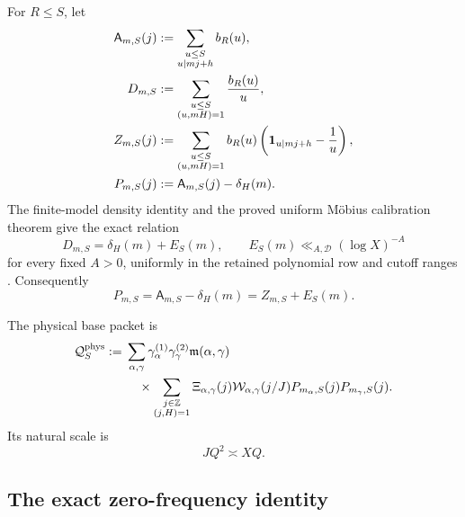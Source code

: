For $R\le S$, let
\begin{align}
 \mathsf A_{m,S}(j)
 &:=\sum_{\substack{u\le S\\u\mid mj+h}}b_R(u),
 \label{eq:tpc28-raw-prefix}\\
 D_{m,S}
 &:=\sum_{\substack{u\le S\\(u,mH)=1}}\frac{b_R(u)}u,
 \label{eq:tpc28-prefix-density}\\
 Z_{m,S}(j)
 &:=\sum_{\substack{u\le S\\(u,mH)=1}}
 b_R(u)\left(\mathbf 1_{u\mid mj+h}-\frac1u\right),
 \label{eq:tpc28-centered-prefix}\\
 P_{m,S}(j)
 &:=\mathsf A_{m,S}(j)-\delta_H(m).
 \label{eq:tpc28-calibrated-prefix}
\end{align}
The finite-model density identity and the proved uniform M\"obius
calibration theorem give the exact relation
\begin{equation}
 D_{m,S}=\delta_H(m)+E_S(m),
 \qquad
 E_S(m)\ll_{A,\mathscr D}(\log X)^{-A}
 \label{eq:tpc28-density-calibration}
\end{equation}
for every fixed $A>0$, uniformly in the retained polynomial row and
cutoff ranges \citep{WangTPC20,WangTPC27}.  Consequently
\begin{equation}
 \boxed{P_{m,S}=\mathsf A_{m,S}-\delta_H(m)
 =Z_{m,S}+E_S(m).}
 \label{eq:tpc28-two-prefix-bridges}
\end{equation}

The physical base packet is
\begin{align}
 \mathcal Q_S^{\rm phys}
 :={}&\sum_{\alpha,\gamma}
 \gamma_\alpha^{(1)}\gamma_\gamma^{(2)}
 \mathfrak m(\alpha,\gamma)
 \notag\\
 &\quad\times
 \sum_{\substack{j\in\mathbb Z\\(j,H)=1}}
 \Xi_{\alpha,\gamma}(j)
 \mathcal W_{\alpha,\gamma}(j/J)
 P_{m_\alpha,S}(j)P_{m_\gamma,S}(j).
 \label{eq:tpc28-physical-base}
\end{align}
Its natural scale is
\begin{equation}
 JQ^2\asymp XQ.
 \label{eq:tpc28-natural-scale}
\end{equation}

\subsection{The exact zero-frequency identity}

